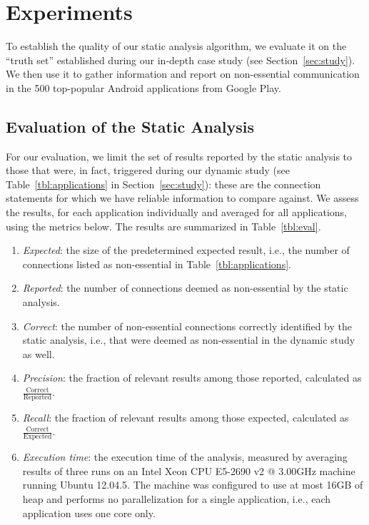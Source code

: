 \section{Experiments}
\label{sec:evaluation}
To establish the quality of our static analysis algorithm, we evaluate it on the ``truth set'' established during our in-depth case study (see Section~\ref{sec:study}). We then use it to gather information and report on non-essential communication in the 500 top-popular Android applications from Google Play.

\subsection{Evaluation of the Static Analysis}
For our evaluation, we limit the set of results reported by the static analysis to those that were, in fact,
 triggered during our dynamic study (see Table~\ref{tbl:applications} in Section~\ref{sec:study}): these are the connection statements for which we have reliable information to compare against. 
We assess the results, for each application individually and averaged for all applications, using the metrics below. The results are summarized in Table~\ref{tbl:eval}.

\begin{enumerate}\setlength{\itemsep}{-0.05in}
\item
\emph{Expected}: the size of the predetermined expected result, i.e., the number of connections listed as non-essential in Table~\ref{tbl:applications}.
\item
\emph{Reported}: the number of connections deemed as non-essential by the static analysis. 
\item
 \emph{Correct}: the number of non-essential connections correctly identified by the static analysis, i.e., that were deemed as non-essential in the dynamic study as well.
\item
\emph{Precision}: the fraction of relevant results among those reported,
 calculated as \emph{$\frac{\text{Correct}}{\text{Reported}}$}. 
\item
\emph{Recall}: the fraction of relevant results among those expected, calculated as
\emph{$\frac{\text{Correct}}{\text{Expected}}$}.
\item \emph{Execution time}: the execution time of the analysis, measured by averaging results of
three runs on an Intel\textsuperscript{\textregistered} Xeon\textsuperscript{\textregistered} CPU E5-2690 v2 @ 3.00GHz machine running Ubuntu 12.04.5. The machine was configured to use at most 16GB of heap and performs no parallelization for a single application, i.e., each application uses one core only.
\end{enumerate}
  
